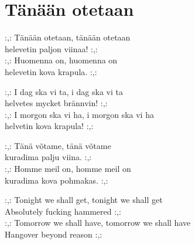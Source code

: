 \section{Tänään otetaan}
:,: Tänään otetaan, tänään otetaan\\
helevetin paljon viinaa! :,:\\
:,: Huomenna on, huomenna on\\
helevetin kova krapula. :,:

:,: I dag ska vi ta, i dag ska vi ta\\
helvetes mycket brännvin! :,:\\
:,: I morgon ska vi ha, i morgon ska vi ha\\
helvetin kova krapula! :,:

:,: Tänä võtame, tänä võtame\\
kuradima palju viina. :,:\\
:,: Homme meil on, homme meil on\\
kuradima kova pohmakas. :,:

:,: Tonight we shall get, tonight we shall get\\
Absolutely fucking hammered :,:\\
:,: Tomorrow we shall have, tomorrow we shall have\\
Hangover beyond reason :,: